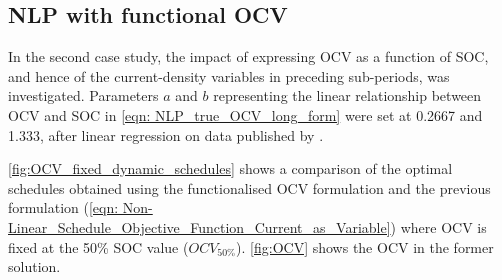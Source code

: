 \documentclass[preprint,3p,review,authoryear,10pt]{elsarticle}
\begin{document}
\subsection{NLP with functional OCV}
\label{Results_NLP_Functional_OCV}
In the second case study, the impact of expressing OCV as a function of SOC, and hence of the current-density variables in preceding sub-periods, was investigated. Parameters $a$ and $b$ representing the linear relationship between OCV and SOC in \cref{eqn: NLP_true_OCV_long_form} were set at 0.2667 and 1.333, after linear regression on data published by \cite{Kim2011}. 

\cref{fig:OCV_fixed_dynamic_schedules} shows a comparison of the optimal schedules obtained using the functionalised OCV formulation and the previous formulation (\cref{eqn: Non-Linear_Schedule_Objective_Function_Current_as_Variable}) where OCV is fixed at the 50\% SOC value ($OCV_{50\%}$). \cref{fig:OCV} shows the OCV in the former solution.
\end{document}
